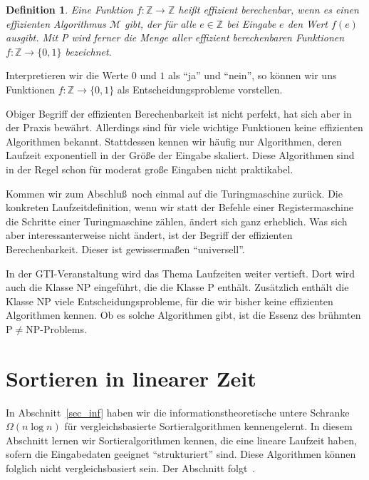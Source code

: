 \documentclass[10pt,reqno]{amsart}
\numberwithin{equation}{section}
\newcommand\cM{\mathcal M}
\newcommand\ZZ{\mathbb Z}
\newtheorem{definition}{Definition}[section]
\begin{document}
\begin{definition}\label{def_P}
	Eine Funktion $f:\ZZ\to\ZZ$ hei\ss t {\em effizient berechenbar}, wenn es einen effizienten Algorithmus $\cM$ gibt, der f\"ur alle $e\in\ZZ$ bei Eingabe $e$ den Wert $f(e)$ ausgibt.
	Mit P wird ferner die Menge aller effizient berechenbaren Funktionen $f:\ZZ\to\{0,1\}$ bezeichnet.
\end{definition}

Interpretieren wir die Werte $0$ und $1$ als ``ja'' und ``nein'', so k\"onnen wir uns Funktionen $f:\ZZ\to\{0,1\}$ als Entscheidungsprobleme vorstellen.

Obiger Begriff der effizienten Berechenbarkeit ist nicht perfekt, hat sich aber in der Praxis bew\"ahrt.
Allerdings sind f\"ur viele wichtige Funktionen keine effizienten Algorithmen bekannt.
Stattdessen kennen wir h\"aufig nur Algorithmen, deren Laufzeit exponentiell in der Gr\"o\ss e der Eingabe skaliert. 
Diese Algorithmen sind in der Regel schon f\"ur moderat gro\ss e Eingaben nicht praktikabel.

Kommen wir zum Abschlu\ss\ noch einmal auf die Turingmaschine zur\"uck.
Die konkreten Laufzeitdefinition, wenn wir statt der Befehle einer Registermaschine die Schritte einer Turingmaschine z\"ahlen, \"andert sich ganz erheblich.
Was sich aber interessanterweise nicht \"andert, ist der Begriff der effizienten Berechenbarkeit.
Dieser ist gewisserma\ss en ``universell''.

In der GTI-Veranstaltung wird das Thema Laufzeiten weiter vertieft.
Dort wird auch die Klasse NP eingef\"uhrt, die die Klasse P enth\"alt.
Zus\"atzlich enth\"alt die Klasse NP viele Entscheidungsprobleme, f\"ur die wir bisher keine effizienten Algorithmen kennen.
Ob es solche Algorithmen gibt, ist die Essenz des br\"uhmten P$\neq$NP-Problems.

\section{Sortieren in linearer Zeit}\label{sec_radix}

\noindent
In Abschnitt~\ref{sec_inf} haben wir die informationstheoretische untere Schranke $\Omega(n\log n)$ f\"ur vergleichsbasierte Sortieralgorithmen kennengelernt.
In diesem Abschnitt lernen wir Sortieralgorithmen kennen, die eine lineare Laufzeit haben, sofern die Eingabedaten geeignet ``strukturiert'' sind.
Diese Algorithmen k\"onnen folglich nicht vergleichsbasiert sein.
Der Abschnitt folgt~\cite{Cormen}.
\end{document}
